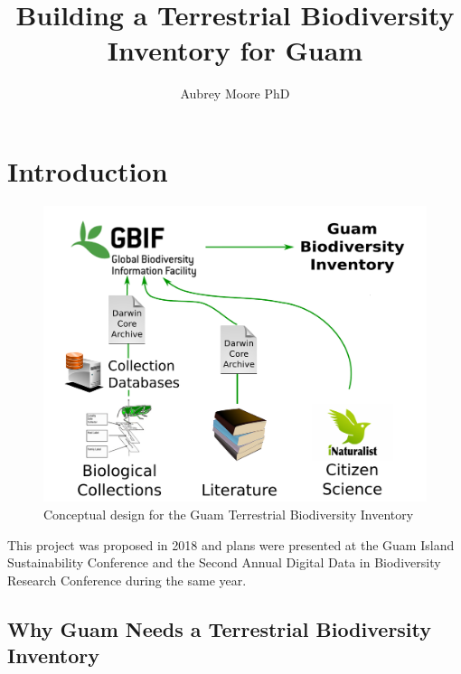 \documentclass[12pt,letterpaper,english,bibliography=totocnumbered, abstract=on]{scrartcl}
\begin{document}
\titlehead{Final Report: McIntire-Stennis Project GU0930}

\title{Building a Terrestrial Biodiversity Inventory for Guam}

\author{Aubrey Moore PhD}

\maketitle
\newpage
\tableofcontents





\pagebreak
\section{Introduction}
\newrefsection[my.bib]

\begin{figure}[h]
	\includegraphics[width=\linewidth]{images/diag1}
	\caption{Conceptual design for the Guam Terrestrial Biodiversity Inventory}
	\label{fig:diag1}
\end{figure}

This project was proposed in 2018 \cite{moore_mcintire-stennis_2018} and plans were presented at the Guam Island Sustainability Conference \cite{moore_building_2018} and the Second Annual Digital Data in Biodiversity Research Conference \cite{moore_building_2018-1} during the same year.

\subsection{Why Guam Needs a Terrestrial Biodiversity Inventory}
\end{document}
